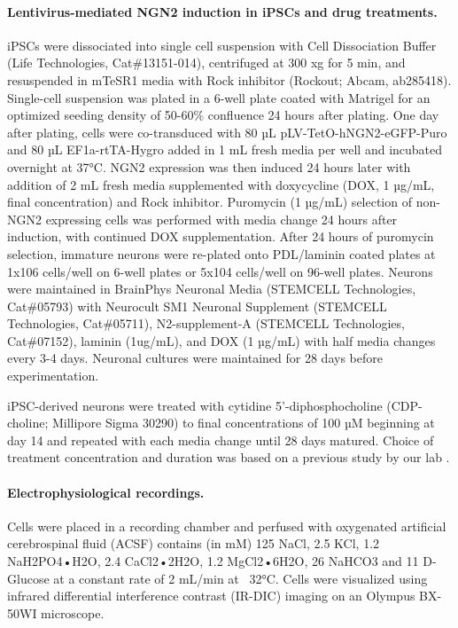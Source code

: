 \documentclass[12pt]{article}
\begin{document}
\paragraph{Lentivirus-mediated NGN2 induction in iPSCs and drug treatments.}
iPSCs were dissociated into single cell suspension with Cell Dissociation Buffer (Life Technologies, Cat\#13151-014), centrifuged at 300 xg for 5 min, and resuspended in mTeSR1 media with Rock inhibitor (Rockout; Abcam, ab285418). Single-cell suspension was plated in a 6-well plate coated with Matrigel for an optimized seeding density of 50-60\% confluence 24 hours after plating. One day after plating, cells were co-transduced with 80 µL pLV-TetO-hNGN2-eGFP-Puro and 80 µL EF1a-rtTA-Hygro added in 1 mL fresh media per well and incubated overnight at 37°C. NGN2 expression was then induced 24 hours later with addition of 2 mL fresh media supplemented with doxycycline (DOX, 1 µg/mL, final concentration) and Rock inhibitor. Puromycin (1 µg/mL) selection of non-NGN2 expressing cells was performed with media change 24 hours after induction, with continued DOX supplementation. After 24 hours of puromycin selection, immature neurons were re-plated onto PDL/laminin coated plates at 1x106 cells/well on 6-well plates or 5x104 cells/well on 96-well plates. Neurons were maintained in BrainPhys Neuronal Media (STEMCELL Technologies, Cat\#05793) with Neurocult SM1 Neuronal Supplement (STEMCELL Technologies, Cat\#05711), N2-supplement-A (STEMCELL Technologies, Cat\#07152), laminin (1ug/mL), and DOX (1 µg/mL) with half media changes every 3-4 days. Neuronal cultures were maintained for 28 days before experimentation.

iPSC-derived neurons were treated with cytidine 5’-diphosphocholine (CDP-choline; Millipore Sigma 30290) to final concentrations of 100 µM beginning at day 14 and repeated with each media change until 28 days matured. Choice of treatment concentration and duration was based on a previous study by our lab \cite{Sienski2021-zt}.

\paragraph{Electrophysiological recordings.}
Cells were placed in a recording chamber and perfused with oxygenated artificial cerebrospinal fluid (ACSF) contains (in mM) 125 NaCl, 2.5 KCl, 1.2 NaH2PO4•H2O, 2.4 CaCl2•2H2O, 1.2 MgCl2•6H2O, 26 NaHCO3 and 11 D-Glucose at a constant rate of 2 mL/min at ~32°C. Cells were visualized using infrared differential interference contrast (IR-DIC) imaging on an Olympus BX-50WI microscope.
\end{document}

